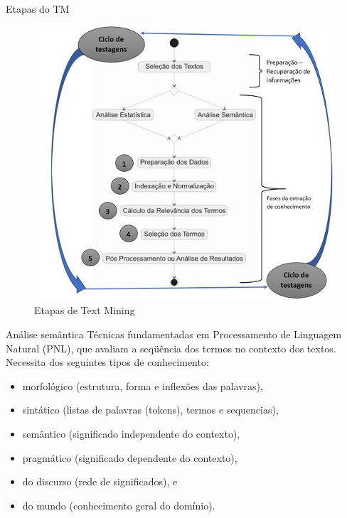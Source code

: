\documentclass[
  ignorenonframetext,
]{beamer}
\begin{document}
\begin{frame}{Etapas do TM}
\protect\hypertarget{etapas-do-tm}{}
\begin{figure}
\centering
\includegraphics{Fases TM.png}
\caption{Etapas de Text Mining}
\end{figure}
\end{frame}

\begin{frame}{Análise semântica}
\protect\hypertarget{anuxe1lise-semuxe2ntica}{}
Técnicas fundamentadas em Processamento de Linguagem Natural (PNL), que
avaliam a seqüência dos termos no contexto dos textos. Necessita dos
seguintes tipos de conhecimento:

\begin{itemize}[<+->]
\item
  morfológico (estrutura, forma e inﬂexões das palavras),
\item
  sintático (listas de palavras (tokens), termos e sequencias),
\item
  semântico (significado independente do contexto),
\item
  pragmático (significado dependente do contexto),
\item
  do discurso (rede de significados), e
\item
  do mundo (conhecimento geral do domínio).
\end{itemize}
\end{frame}
\end{document}
